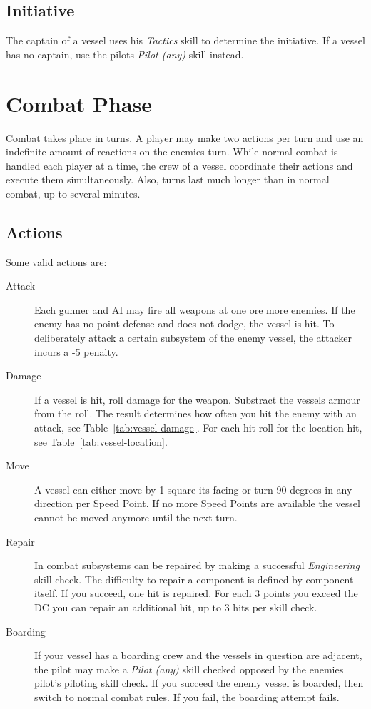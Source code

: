 \subsection{Initiative}
\label{sub:Vessels-Combat-Setup-Initiative}

The captain of a vessel uses his \emph{Tactics} skill to determine the initiative. If a vessel has no captain, use the pilots \emph{Pilot (any)} skill instead.

\section{Combat Phase}
\label{sec:Vessels-Combat-Combat-Phase}

Combat takes place in turns. A player may make two actions per turn and use an indefinite amount of reactions on the enemies turn. While normal combat is handled each player at a time, the crew of a vessel coordinate their actions and execute them simultaneously. Also, turns last much longer than in normal combat, up to several minutes.

\subsection{Actions}
\label{sub:Actions}

Some valid actions are:

\begin{description}
  \item[Attack]
  Each gunner and AI may fire all weapons at one ore more enemies. If the enemy has no point defense and does not dodge, the vessel is hit. To deliberately attack a certain subsystem of the enemy vessel, the attacker incurs a -5 penalty.
  \item[Damage]
  If a vessel is hit, roll damage for the weapon. Substract the vessels armour from the roll. The result determines how often you hit the enemy with an attack, see Table~\ref{tab:vessel-damage}. For each hit roll for the location hit, see Table~\ref{tab:vessel-location}.
  \item[Move]
  A vessel can either move by 1 square its facing or turn 90 degrees in any direction per Speed Point. If no more Speed Points are available the vessel cannot be moved anymore until the next turn.
  \item[Repair]
  In combat subsystems can be repaired by making a successful \emph{Engineering} skill check. The difficulty to repair a component is defined by component itself. If you succeed, one hit is repaired. For each 3 points you exceed the DC you can repair an additional hit, up to 3 hits per skill check.
  \item[Boarding]
  If your vessel has a boarding crew and the vessels in question are adjacent, the pilot may make a \emph{Pilot (any)} skill checked opposed by the enemies pilot's piloting skill check. If you succeed the enemy vessel is boarded, then switch to normal combat rules. If you fail, the boarding attempt fails.
\end{description}


